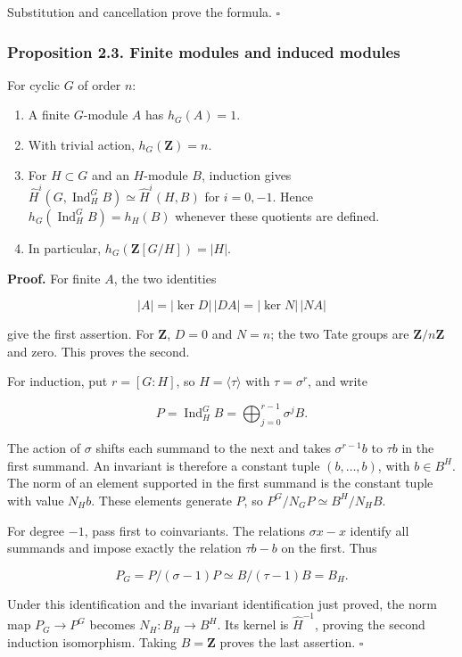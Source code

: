 \documentclass[11pt,a4paper]{article}
\newcommand{\tightlist}{\setlength{\itemsep}{0pt}\setlength{\parskip}{0pt}}
\begin{document}
Substitution and cancellation prove the formula. \(\square\)

\subsubsection{Proposition 2.3. Finite modules and induced
modules}\label{proposition-2.3.-finite-modules-and-induced-modules}

For cyclic \(G\) of order \(n\):

\begin{enumerate}
\def\labelenumi{\arabic{enumi}.}
\tightlist
\item
  A finite \(G\)-module \(A\) has \(h_G(A)=1\).
\item
  With trivial action, \(h_G(\mathbf Z)=n\).
\item
  For \(H\subset G\) and an \(H\)-module \(B\), induction gives
  \(\widehat H^i(G,\operatorname{Ind}_H^G B)\simeq\widehat H^i(H,B)\)
  for \(i=0,-1\). Hence \(h_G(\operatorname{Ind}_H^G B)=h_H(B)\)
  whenever these quotients are defined.
\item
  In particular, \(h_G(\mathbf Z[G/H])=|H|\).
\end{enumerate}

\textbf{Proof.} For finite \(A\), the two identities

\[
|A|=|\ker D|\,|DA|=|\ker N|\,|NA|
\]

give the first assertion. For \(\mathbf Z\), \(D=0\) and \(N=n\); the
two Tate groups are \(\mathbf Z/n\mathbf Z\) and zero. This proves the
second.

For induction, put \(r=[G:H]\), so \(H=\langle\tau\rangle\) with
\(\tau=\sigma^r\), and write

\[
P=\operatorname{Ind}_H^G B=
\bigoplus_{j=0}^{r-1}\sigma^j B.
\]

The action of \(\sigma\) shifts each summand to the next and takes
\(\sigma^{r-1}b\) to \(\tau b\) in the first summand. An invariant is
therefore a constant tuple \((b,\ldots,b)\), with \(b\in B^H\). The norm
of an element supported in the first summand is the constant tuple with
value \(N_Hb\). These elements generate \(P\), so
\(P^G/N_GP\simeq B^H/N_HB\).

For degree \(-1\), pass first to coinvariants. The relations
\(\sigma x-x\) identify all summands and impose exactly the relation
\(\tau b-b\) on the first. Thus

\[
P_G=P/(\sigma-1)P\simeq B/(\tau-1)B=B_H.
\]

Under this identification and the invariant identification just proved,
the norm map \(P_G\to P^G\) becomes \(N_H:B_H\to B^H\). Its kernel is
\(\widehat H^{-1}\), proving the second induction isomorphism. Taking
\(B=\mathbf Z\) proves the last assertion. \(\square\)
\end{document}
